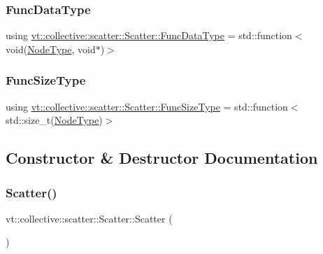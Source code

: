 \subsubsection{\texorpdfstring{Func\+Data\+Type}{FuncDataType}}
{\footnotesize\ttfamily using \hyperlink{structvt_1_1collective_1_1scatter_1_1_scatter_a4040244e8ed36afd5d408c27efceea1b}{vt\+::collective\+::scatter\+::\+Scatter\+::\+Func\+Data\+Type} =  std\+::function$<$void(\hyperlink{namespacevt_a866da9d0efc19c0a1ce79e9e492f47e2}{Node\+Type}, void$\ast$)$>$}

\mbox{\label{structvt_1_1collective_1_1scatter_1_1_scatter_a977d895e42999a4078c6705ac851f447}} 
\subsubsection{\texorpdfstring{Func\+Size\+Type}{FuncSizeType}}
{\footnotesize\ttfamily using \hyperlink{structvt_1_1collective_1_1scatter_1_1_scatter_a977d895e42999a4078c6705ac851f447}{vt\+::collective\+::scatter\+::\+Scatter\+::\+Func\+Size\+Type} =  std\+::function$<$std\+::size\+\_\+t(\hyperlink{namespacevt_a866da9d0efc19c0a1ce79e9e492f47e2}{Node\+Type})$>$}



\subsection{Constructor \& Destructor Documentation}
\mbox{\label{structvt_1_1collective_1_1scatter_1_1_scatter_a33ea9a78c5d43dcea4ec2cb69d8b00b4}} 
\subsubsection{\texorpdfstring{Scatter()}{Scatter()}}
{\footnotesize\ttfamily vt\+::collective\+::scatter\+::\+Scatter\+::\+Scatter (\begin{DoxyParamCaption}{ }\end{DoxyParamCaption})}



